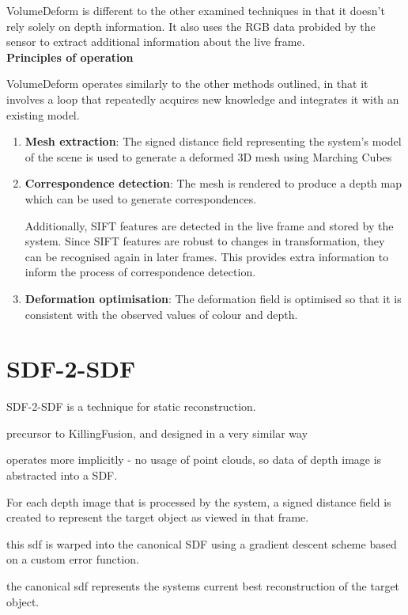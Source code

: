 \documentclass[12pt,twoside]{report}
\begin{document}
VolumeDeform is different to the other examined techniques in that it doesn't rely solely on depth information. It also uses the RGB data probided by the sensor to extract additional information about the live frame.\\


\noindent\textbf{Principles of operation}

VolumeDeform operates similarly to the other methods outlined, in that it involves a loop that repeatedly acquires new knowledge and integrates it with an existing model.

\begin{enumerate}
\item \textbf{Mesh extraction}: The signed distance field representing the system's model of the scene is used to generate a deformed 3D mesh using Marching Cubes
\item \textbf{Correspondence detection}: The mesh is rendered to produce a depth map which can be used to generate correspondences.

Additionally, SIFT features are detected in the live frame and stored by the system. Since SIFT features are robust to changes in transformation, they can be recognised again in later frames. This provides extra information to inform the process of correspondence detection.

\item \textbf{Deformation optimisation}: The deformation field is optimised so that it is consistent with the observed values of colour and depth.
\end{enumerate}


\section{SDF-2-SDF}

SDF-2-SDF is a technique for static reconstruction.

precursor to KillingFusion, and designed in a very similar way

operates more implicitly - no usage of point clouds, so data of depth image is abstracted into a SDF.

For each depth image that is processed by the system, a signed distance field is created to represent the target object as viewed in that frame.

this sdf is warped into the canonical SDF using a gradient descent scheme based on a custom error function.

the canonical sdf represents the systems current best reconstruction of the target object.
\end{document}

